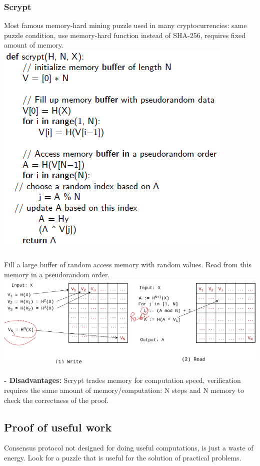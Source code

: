 \documentclass{article}
\begin{document}
\subsubsection{Scrypt}
Most famous memory-hard mining puzzle used in many cryptocurrencies: same puzzle condition, use memory-hard function instead of SHA-256, requires fixed amount of memory. \\
\includegraphics[scale=0.7]{41.png}\\\\
Fill a large buffer of random access memory with random values. Read from this memory in a pseudorandom order.\\
\includegraphics[scale=0.7]{42.png}\\\\
\textbf{- Disadvantages: }Scrypt trades memory for computation speed, verification requires the same amount of memory/computation: N steps and N
memory to check the correctness of the proof.\\

\subsection{Proof of useful work}
Consensus protocol not designed for doing useful computations, is just a waste of energy. Look for a puzzle that is useful for the solution of practical problems.
\end{document}
